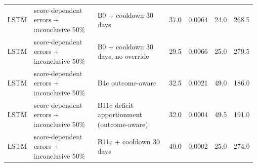 \begin{longtable}{lp{5.2cm}p{4.4cm}cccc}
LSTM & score-dependent errors + inconclusive 50\% & B0 + cooldown 30 days & 37.0 & 0.0064 & 24.0 & 268.5 \\
LSTM & score-dependent errors + inconclusive 50\% & B0 + cooldown 30 days, no override & 29.5 & 0.0066 & 25.0 & 279.5 \\
LSTM & score-dependent errors + inconclusive 50\% & B4c outcome-aware & 32.5 & 0.0021 & 49.0 & 186.0 \\
LSTM & score-dependent errors + inconclusive 50\% & B11c deficit apportionment (outcome-aware) & 32.0 & 0.0004 & 49.5 & 191.0 \\
LSTM & score-dependent errors + inconclusive 50\% & B11c + cooldown 30 days & 40.0 & 0.0002 & 25.0 & 274.0 \\
\bottomrule
\end{longtable}


